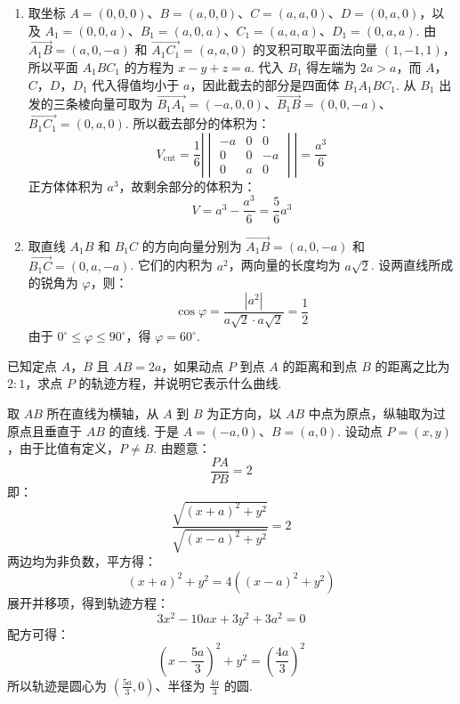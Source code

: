 \begin{solution}
\begin{enumerate}
\item 取坐标 \(A=(0,0,0)\)、\(B=(a,0,0)\)、\(C=(a,a,0)\)、\(D=(0,a,0)\)，以及 \(A_1=(0,0,a)\)、\(B_1=(a,0,a)\)、\(C_1=(a,a,a)\)、\(D_1=(0,a,a)\).
由 \(\overrightarrow{A_1B}=(a,0,-a)\) 和 \(\overrightarrow{A_1C_1}=(a,a,0)\) 的叉积可取平面法向量 \((1,-1,1)\)，所以平面 \(A_1BC_1\) 的方程为 \(x-y+z=a\). 代入 \(B_1\) 得左端为 \(2a>a\)，而 \(A\)，\(C\)，\(D\)，\(D_1\) 代入得值均小于 \(a\)，因此截去的部分是四面体 \(B_1A_1BC_1\). 从 \(B_1\) 出发的三条棱向量可取为 \(\overrightarrow{B_1A_1}=(-a,0,0)\)、\(\overrightarrow{B_1B}=(0,0,-a)\)、\(\overrightarrow{B_1C_1}=(0,a,0)\).
所以截去部分的体积为：
\[
 V_{\mathrm{cut}}=\frac16\left|\begin{vmatrix}-a&0&0\\0&0&-a\\0&a&0\end{vmatrix}\right|=\frac{a^3}{6}
\]
正方体体积为 \(a^3\)，故剩余部分的体积为：
\[
 V=a^3-\frac{a^3}{6}=\frac56a^3
\]
\item 取直线 \(A_1B\) 和 \(B_1C\) 的方向向量分别为 \(\overrightarrow{A_1B}=(a,0,-a)\) 和 \(\overrightarrow{B_1C}=(0,a,-a)\).
它们的内积为 \(a^2\)，两向量的长度均为 \(a\sqrt2\). 设两直线所成的锐角为 \(\varphi\)，则：
\[
 \cos\varphi=\frac{|a^2|}{a\sqrt2\cdot a\sqrt2}=\frac12
\]
由于 \(0^\circ\leqslant\varphi\leqslant90^\circ\)，得 \(\varphi=60^\circ\).
\end{enumerate}
\end{solution}

\begin{problem}

已知定点 \(A\)，\(B\) 且 \(AB=2a\)，如果动点 \(P\) 到点 \(A\) 的距离和到点 \(B\) 的距离之比为 \(2:1\)，求点 \(P\) 的轨迹方程，并说明它表示什么曲线.
\end{problem}

\begin{solution}
取 \(AB\) 所在直线为横轴，从 \(A\) 到 \(B\) 为正方向，以 \(AB\) 中点为原点，纵轴取为过原点且垂直于 \(AB\) 的直线. 于是
\(A=(-a,0)\)、\(B=(a,0)\).
设动点 \(P=(x,y)\)，由于比值有定义，\(P\neq B\). 由题意：
\[
 \frac{PA}{PB}=2
\]
即：
\[
 \frac{\sqrt{(x+a)^2+y^2}}{\sqrt{(x-a)^2+y^2}}=2
\]
两边均为非负数，平方得：
\[
 (x+a)^2+y^2=4\left((x-a)^2+y^2\right)
\]
展开并移项，得到轨迹方程：
\[
 3x^2-10ax+3y^2+3a^2=0
\]
配方可得：
\[
 \left(x-\frac{5a}{3}\right)^2+y^2=\left(\frac{4a}{3}\right)^2
\]
所以轨迹是圆心为 \(\left(\frac{5a}{3},0\right)\)、半径为 \(\frac{4a}{3}\) 的圆.
\end{solution}

